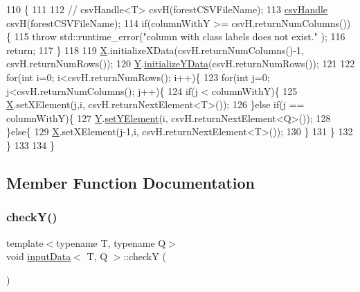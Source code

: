 \begin{DoxyCode}
110         \{
111 
112             \textcolor{comment}{//          csvHandle<T> csvH(forestCSVFileName);}
113             \hyperlink{classcsvHandle}{csvHandle} csvH(forestCSVFileName);
114             \textcolor{keywordflow}{if}(columnWithY >= csvH.returnNumColumns())\{
115                 \textcolor{keywordflow}{throw} std::runtime\_error(\textcolor{stringliteral}{"column with class labels does not exist."} );
116                 \textcolor{keywordflow}{return};
117             \}
118 
119             \hyperlink{classinputData_a31bffca53fea1a24c237e543cc5489a0}{X}.initializeXData(csvH.returnNumColumns()-1, csvH.returnNumRows());
120             \hyperlink{classinputData_a03b936fe0070cee08153cb4853003ab4}{Y}.\hyperlink{classinputYData_abe1f8827e0bc89cec0c218ed5cfeea72}{initializeYData}(csvH.returnNumRows());
121 
122             \textcolor{keywordflow}{for}(\textcolor{keywordtype}{int} i=0; i<csvH.returnNumRows(); i++)\{
123                 \textcolor{keywordflow}{for}(\textcolor{keywordtype}{int} j=0; j<csvH.returnNumColumns(); j++)\{
124                     \textcolor{keywordflow}{if}(j < columnWithY)\{
125                         \hyperlink{classinputData_a31bffca53fea1a24c237e543cc5489a0}{X}.setXElement(j,i, csvH.returnNextElement<T>());
126                     \}\textcolor{keywordflow}{else} \textcolor{keywordflow}{if}(j == columnWithY)\{
127                         \hyperlink{classinputData_a03b936fe0070cee08153cb4853003ab4}{Y}.\hyperlink{classinputYDataClassification_ae6f3f163739a75bb379dd80d7c9649a2}{setYElement}(i, csvH.returnNextElement<Q>());
128                     \}\textcolor{keywordflow}{else}\{
129                         \hyperlink{classinputData_a31bffca53fea1a24c237e543cc5489a0}{X}.setXElement(j-1,i, csvH.returnNextElement<T>());
130                     \}
131                 \}
132             \}
133 
134         \}
\end{DoxyCode}


\subsection{Member Function Documentation}
\mbox{\label{classinputData_aa40d52511c8ccdad2011fef47d0200a2}} 
\subsubsection{\texorpdfstring{check\+Y()}{checkY()}}
{\footnotesize\ttfamily template$<$typename T, typename Q$>$ \\
void \hyperlink{classinputData}{input\+Data}$<$ T, Q $>$\+::checkY (\begin{DoxyParamCaption}{ }\end{DoxyParamCaption})\hspace{0.3cm}{\ttfamily [inline]}}



